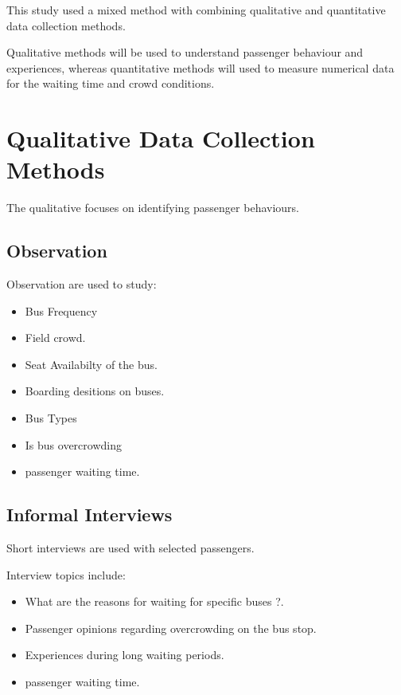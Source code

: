 \documentclass[12pt,a4paper]{report}
\begin{document}
This study used a mixed method with combining qualitative and quantitative data collection methods.

Qualitative methods will be used to understand passenger behaviour and experiences,
whereas quantitative methods will used to measure numerical data for the waiting
time and crowd conditions.


\section{Qualitative Data Collection Methods}

The qualitative focuses on identifying passenger behaviours.


\subsection{Observation}

Observation are  used to study:

\begin{itemize}[noitemsep]

\item Bus Frequency
\item Field crowd.
\item Seat Availabilty of the bus.
\item Boarding desitions on buses.
\item Bus Types
\item Is bus overcrowding
\item passenger waiting time.

\end{itemize}


\subsection{Informal Interviews}

Short interviews are used with selected passengers.

Interview topics include:

\begin{itemize}[noitemsep]

\item What are the reasons for waiting for specific buses ?.
\item Passenger opinions regarding overcrowding on the bus stop.
\item Experiences during long waiting periods.
\item passenger waiting time.

\end{itemize}
\end{document}
